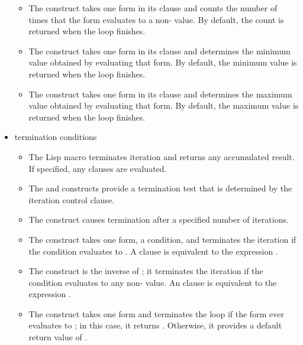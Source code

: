 \begin{itemize}
\begin{itemize}
  \item 
  The  construct takes one form in its clause and counts the
  number of times that the form evaluates to a non- value.  By
  default, the count is returned when the loop finishes.

  \item
  The  construct takes one form in its clause and determines
  the minimum value obtained by evaluating that form.  By default, the
  minimum value is returned when the loop finishes.

  \item
  The  construct takes one form in its clause and 
  determines the maximum value obtained by evaluating that form.  By
  default, the maximum value is returned when the loop finishes.
  \end{itemize}

  \item
  termination conditions

  \begin{itemize}
  \item
  The  Lisp macro terminates iteration and returns any
  accumulated result.  If specified, any  clauses are evaluated.

  \item
  The  and  constructs provide a termination test
  that is determined by the iteration control clause.

  \item
   The  construct causes termination after a specified
  number of iterations.

  \item 
  The  construct takes one form, a condition, and terminates
  the iteration if
  the condition evaluates to .  A  clause is
  equivalent to the expression .  

  \item 
   The  construct is the inverse of ;
   it terminates the iteration if the condition evaluates to any non-
   value.  An  clause is equivalent to the expression
  .

  \item
  The  construct takes one form and terminates the loop 
  if the form ever evaluates to ; in this case, it returns
  .  Otherwise, it provides a default return value of .


\end{itemize}
\end{itemize}
